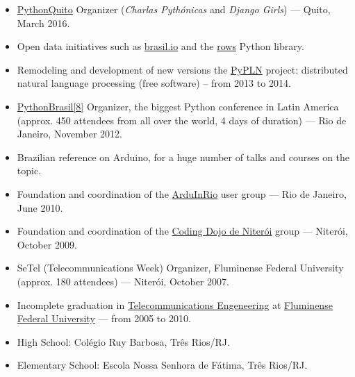 \documentclass[a4paper,11pt]{article}
\begin{document}
	\begin{itemize}
		\item \href{http://pythonquito.tk}{PythonQuito} Organizer
			(\textit{Charlas Pythónicas} and \textit{Django Girls}) --- Quito,
			March 2016.
		\item Open data initiatives such as \href{http://brasil.io/}{brasil.io}
			and the \href{https://github.com/turicas/rows}{rows} Python
			library.
		\item Remodeling and development of new versions the
			\href{http://pypln.org/}{PyPLN} project: distributed natural
			language processing (free software) -- from 2013 to 2014.
		\item \href{http://2012.pythonbrasil.org.br/}{PythonBrasil[8]}
			Organizer, the biggest Python conference in Latin America (approx.
			450 attendees from all over the world, 4 days of duration) --- Rio
			de Janeiro, November 2012.
		\item Brazilian reference on Arduino, for a huge number of talks and
			courses on the topic.
		\item Foundation and coordination of the
			\href{https://groups.google.com/forum/#!forum/arduinrio}{ArduInRio}
			user group --- Rio de Janeiro, June 2010.
		\item Foundation and coordination of the
			\href{http://dojorio.org}{Coding Dojo de Niterói} group ---
			Niterói, October 2009.
		\item SeTel (Telecommunications Week) Organizer, Fluminense Federal
			University (approx. 180 attendees) --- Niterói, October 2007.
	 \end{itemize}


	\begin{itemize}
		\item Incomplete graduation in
			\href{http://telecom.uff.br/}{Telecommunications Engeneering} at
			\href{http://www.uff.br/}{Fluminense Federal University} ---
			from 2005 to 2010.
		\item High School: Colégio Ruy Barbosa, Três Rios/RJ.
		\item Elementary School: Escola Nossa Senhora de Fátima, Três Rios/RJ.
	 \end{itemize}
\end{document}

